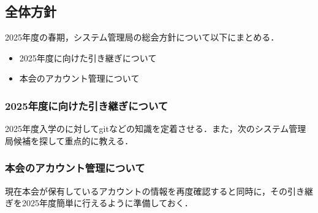 \subsection*{全体方針}


2025年度の春期，システム管理局の総会方針について以下にまとめる．
\begin{itemize}
    \item 2025年度に向けた引き継ぎについて
    \item 本会のアカウント管理について
\end{itemize}

\subsubsection*{2025年度に向けた引き継ぎについて}
2025年度入学の\firstGrade{}に対してgitなどの知識を定着させる．また，次のシステム管理局候補を探して重点的に教える．

\subsubsection*{本会のアカウント管理について}
現在本会が保有しているアカウントの情報を再度確認すると同時に，その引き継ぎを2025年度簡単に行えるように準備しておく．
